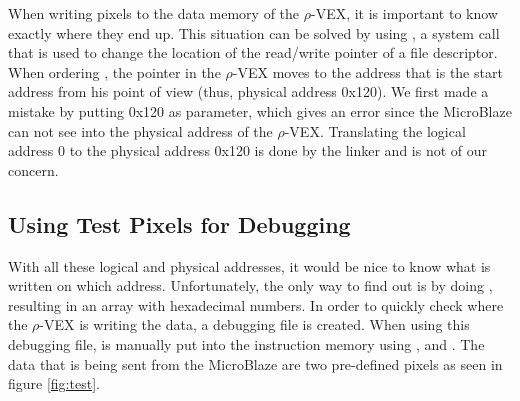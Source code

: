 When writing pixels to the data memory of the $\rho$-VEX, it is important to know exactly where they end up. This situation can be solved by using , a system call that is used to change the location of the read/write pointer of a file descriptor. When ordering , the pointer in the $\rho$-VEX moves to the address that is the start address from his point of view (thus, physical address 0x120). We first made a mistake by putting 0x120 as  parameter, which gives an error since the MicroBlaze can not see into the physical address of the $\rho$-VEX. Translating the logical address 0 to the physical address 0x120 is done by the linker and is not of our concern.


\subsection{Using Test Pixels for Debugging}

With all these logical and physical addresses, it would be nice to know what is written on which address. Unfortunately, the only way to find out is by doing , resulting in an array with hexadecimal numbers. In order to quickly check where the $\rho$-VEX is writing the data, a debugging file  is created. When using this debugging file,  is manually put into the instruction memory using ,  and . The data that is being sent from the MicroBlaze are two pre-defined pixels as seen in figure \ref{fig:test}.